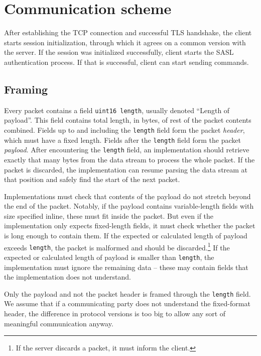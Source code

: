 
\section{Communication scheme}

After establishing the TCP connection and successful TLS handshake, the client starts session initialization,
through which it agrees on a common version with the server. If the session was initialized successfully,
client starts the SASL authentication process. If that is successful, client can start sending commands.

%

\subsection{Framing}

Every packet contains a field {\tt uint16 length}, usually denoted ``Length of payload''. This field contains
total length, in bytes, of rest of the packet contents combined. Fields up to and including the {\tt length}
field form the packet {\it header}, which must have a fixed length. Fields after the {\tt length} field form
the packet {\it payload}. After encountering the {\tt length} field, an implementation should retrieve exactly
that many bytes from the data stream to process the whole packet. If the packet is discarded, the
implementation can resume parsing the data stream at that position and safely find the start of the next
packet.

Implementations must check that contents of the payload do not stretch beyond the end of the packet. Notably,
if the payload contains variable-length fields with size specified inline, these must fit inside the packet.
But even if the implementation only expects fixed-length fields, it must check whether the packet is long
enough to contain them. If the expected or calculated length of payload exceeds {\tt length}, the packet is
malformed and should be discarded.\footnote{If the server discards a packet, it must inform the client.} If
the expected or calculated length of payload is smaller than {\tt length}, the implementation must ignore the
remaining data -- these may contain fields that the implementation does not understand.

Only the payload and not the packet header is framed through the {\tt length} field. We assume that if
a communicating party does not understand the fixed-format header, the difference in protocol versions is too
big to allow any sort of meaningful communication anyway.

